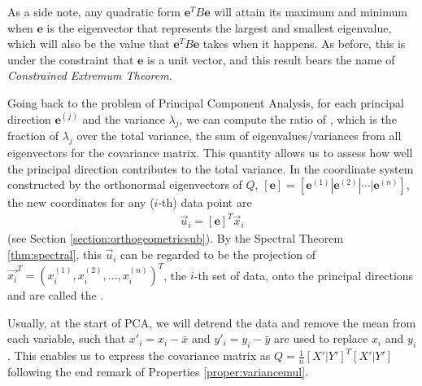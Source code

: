 As a side note, any quadratic form $\textbf{e}^TB\textbf{e}$ will attain its maximum and minimum when $\textbf{e}$ is the eigenvector that represents the largest and smallest eigenvalue, which will also be the value that $\textbf{e}^TB\textbf{e}$ takes when it happens. As before, this is under the constraint that $\textbf{e}$ is a unit vector, and this result bears the name of \textit{Constrained Extremum Theorem}.\par
Going back to the problem of Principal Component Analysis, for each principal direction $\textbf{e}^{(j)}$ and the variance $\lambda_{j}$, we can compute the ratio of , which is the fraction of  $\lambda_{j}$ over the total variance, the sum of eigenvalues/variances from all eigenvectors for the covariance matrix. This quantity allows us to assess how well the principal direction contributes to the total variance. In the coordinate system constructed by the orthonormal eigenvectors of $Q$, $[\textbf{e}] = [\textbf{e}^{(1)}|\textbf{e}^{(2)}|\cdots|\textbf{e}^{(n)}]$, the new coordinates for any ($i$-th) data point are \begin{align}
\vec{u}_i = [\textbf{e}]^T \vec{x}_i \label{eqn:PCAcoordchange} 
\end{align} (see Section \ref{section:orthogeometricsub}). By the Spectral Theorem \ref{thm:spectral}, this $\vec{u}_i$ can be regarded to be the projection of $\vec{x_i}^T = (x_i^{(1)}, x_i^{(2)}, \ldots, x_i^{(n)})^T$, the $i$-th set of data, onto the principal directions and are called the . \par
Usually, at the start of PCA, we will detrend the data and remove the mean from each variable, such that $x'_i = x_i - \bar{x}$ and $y'_i = y_i - \bar{y}$ are used to replace $x_i$ and $y_i$. This enables us to express the covariance matrix as $Q = \frac{1}{n}[X'|Y']^T[X'|Y']$ following the end remark of Properties \ref{proper:variancemul}. 
